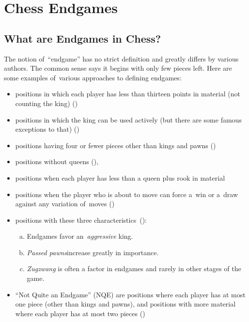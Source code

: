 \chapter{Chess Endgames}
\label{ch:Chess}

\section{What are Endgames in Chess?}
The notion of~``endgame'' has no strict definition and greatly differs by various authors.
The common sense says it begins with only few pieces left.
Here are some examples of~various approaches to defining endgames:
\begin{itemize}
  \item
    positions in which each player has less than thirteen points in material (not counting the king)
    (\cite[pp.~7--8]{Speelman1981endgame})
    
  \item
    positions in which the king can be used actively (but there are some famous exceptions to that)
    (\cite[pp.~7--8]{Speelman1981endgame})
    
  \item
    positions having four or fewer pieces other than kings and pawns
    (\cite[p.~5]{Minev2004practical})
    
  \item
    positions without queens
    (\cite{Fine1952middle}),
    
  \item
    positions when each player has less than a queen plus rook in material
    
  \item
    positions when the player who is about to move can force a~win or a~draw against any variation of~moves
    (\cite{Portisch1981six})

  \item 
    positions with these three characteristics~(\cite{Alburt1999just}):

    \begin{enumerate}[(a)]
      \item Endgames favor an~\emph{aggressive} king.
      \item \emph{Passed pawns}\footnotemark increase greatly in importance.
      \item \emph{Zugzwang} is often a factor in endgames and rarely in other stages of the game.
    \end{enumerate}

  \item
    ``Not Quite an Endgame'' (NQE) are positions where each player has at most one piece (other than kings and pawns), and positions with more material where each player has at most two pieces
    (\cite[pp.~7--8]{Flear2007practical})
\end{itemize}

